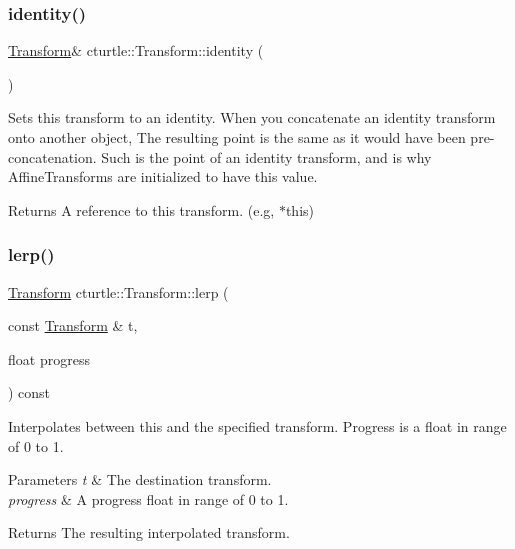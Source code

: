 \subsubsection{\texorpdfstring{identity()}{identity()}}
{\footnotesize\ttfamily \hyperlink{classcturtle_1_1Transform}{Transform}\& cturtle\+::\+Transform\+::identity (\begin{DoxyParamCaption}{ }\end{DoxyParamCaption})\hspace{0.3cm}{\ttfamily [inline]}}



Sets this transform to an identity. When you concatenate an identity transform onto another object, The resulting point is the same as it would have been pre-\/concatenation. Such is the point of an identity transform, and is why Affine\+Transforms are initialized to have this value. 

\begin{DoxyReturn}{Returns}
A reference to this transform. (e.\+g, $\ast$this) 
\end{DoxyReturn}
\mbox{\label{classcturtle_1_1Transform_aafca536c5297631923db197c225e8bf5}} 
\subsubsection{\texorpdfstring{lerp()}{lerp()}}
{\footnotesize\ttfamily \hyperlink{classcturtle_1_1Transform}{Transform} cturtle\+::\+Transform\+::lerp (\begin{DoxyParamCaption}\item[{const \hyperlink{classcturtle_1_1Transform}{Transform} \&}]{t,  }\item[{float}]{progress }\end{DoxyParamCaption}) const\hspace{0.3cm}{\ttfamily [inline]}}



Interpolates between this and the specified transform. Progress is a float in range of 0 to 1. 


\begin{DoxyParams}{Parameters}
{\em t} & The destination transform. \\
\hline
{\em progress} & A progress float in range of 0 to 1. \\
\hline
\end{DoxyParams}
\begin{DoxyReturn}{Returns}
The resulting interpolated transform. 
\end{DoxyReturn}
\mbox{\label{classcturtle_1_1Transform_afc24321e5d8da21c310fd830aa76da84}} 
